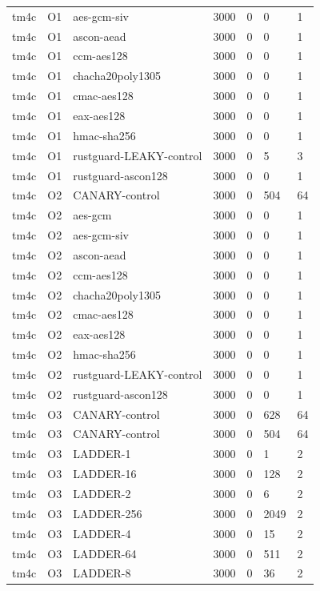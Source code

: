 \begin{table}[t]
\begin{tabular}{lllllll}
    tm4c & O1 & aes-gcm-siv & 3000 & 0 & 0 & 1 \\
    tm4c & O1 & ascon-aead & 3000 & 0 & 0 & 1 \\
    tm4c & O1 & ccm-aes128 & 3000 & 0 & 0 & 1 \\
    tm4c & O1 & chacha20poly1305 & 3000 & 0 & 0 & 1 \\
    tm4c & O1 & cmac-aes128 & 3000 & 0 & 0 & 1 \\
    tm4c & O1 & eax-aes128 & 3000 & 0 & 0 & 1 \\
    tm4c & O1 & hmac-sha256 & 3000 & 0 & 0 & 1 \\
    tm4c & O1 & rustguard-LEAKY-control & 3000 & 0 & 5 & 3 \\
    tm4c & O1 & rustguard-ascon128 & 3000 & 0 & 0 & 1 \\
    tm4c & O2 & CANARY-control & 3000 & 0 & 504 & 64 \\
    tm4c & O2 & aes-gcm & 3000 & 0 & 0 & 1 \\
    tm4c & O2 & aes-gcm-siv & 3000 & 0 & 0 & 1 \\
    tm4c & O2 & ascon-aead & 3000 & 0 & 0 & 1 \\
    tm4c & O2 & ccm-aes128 & 3000 & 0 & 0 & 1 \\
    tm4c & O2 & chacha20poly1305 & 3000 & 0 & 0 & 1 \\
    tm4c & O2 & cmac-aes128 & 3000 & 0 & 0 & 1 \\
    tm4c & O2 & eax-aes128 & 3000 & 0 & 0 & 1 \\
    tm4c & O2 & hmac-sha256 & 3000 & 0 & 0 & 1 \\
    tm4c & O2 & rustguard-LEAKY-control & 3000 & 0 & 0 & 1 \\
    tm4c & O2 & rustguard-ascon128 & 3000 & 0 & 0 & 1 \\
    tm4c & O3 & CANARY-control & 3000 & 0 & 628 & 64 \\
    tm4c & O3 & CANARY-control & 3000 & 0 & 504 & 64 \\
    tm4c & O3 & LADDER-1 & 3000 & 0 & 1 & 2 \\
    tm4c & O3 & LADDER-16 & 3000 & 0 & 128 & 2 \\
    tm4c & O3 & LADDER-2 & 3000 & 0 & 6 & 2 \\
    tm4c & O3 & LADDER-256 & 3000 & 0 & 2049 & 2 \\
    tm4c & O3 & LADDER-4 & 3000 & 0 & 15 & 2 \\
    tm4c & O3 & LADDER-64 & 3000 & 0 & 511 & 2 \\
    tm4c & O3 & LADDER-8 & 3000 & 0 & 36 & 2 \\

\end{tabular}
\end{table}
